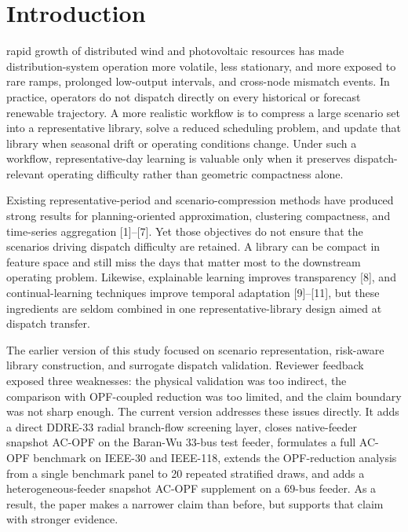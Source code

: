 \documentclass[journal]{IEEEtran}
\begin{document}
\section{Introduction}
 rapid growth of distributed wind and photovoltaic resources has made distribution-system operation more volatile, less stationary, and more exposed to rare ramps, prolonged low-output intervals, and cross-node mismatch events. In practice, operators do not dispatch directly on every historical or forecast renewable trajectory. A more realistic workflow is to compress a large scenario set into a representative library, solve a reduced scheduling problem, and update that library when seasonal drift or operating conditions change. Under such a workflow, representative-day learning is valuable only when it preserves dispatch-relevant operating difficulty rather than geometric compactness alone.

Existing representative-period and scenario-compression methods have produced strong results for planning-oriented approximation, clustering compactness, and time-series aggregation [1]--[7]. Yet those objectives do not ensure that the scenarios driving dispatch difficulty are retained. A library can be compact in feature space and still miss the days that matter most to the downstream operating problem. Likewise, explainable learning improves transparency [8], and continual-learning techniques improve temporal adaptation [9]--[11], but these ingredients are seldom combined in one representative-library design aimed at dispatch transfer.

The earlier version of this study focused on scenario representation, risk-aware library construction, and surrogate dispatch validation. Reviewer feedback exposed three weaknesses: the physical validation was too indirect, the comparison with OPF-coupled reduction was too limited, and the claim boundary was not sharp enough. The current version addresses these issues directly. It adds a direct DDRE-33 radial branch-flow screening layer, closes native-feeder snapshot AC-OPF on the Baran-Wu 33-bus test feeder, formulates a full AC-OPF benchmark on IEEE-30 and IEEE-118, extends the OPF-reduction analysis from a single benchmark panel to 20 repeated stratified draws, and adds a heterogeneous-feeder snapshot AC-OPF supplement on a 69-bus feeder. As a result, the paper makes a narrower claim than before, but supports that claim with stronger evidence.
\end{document}
